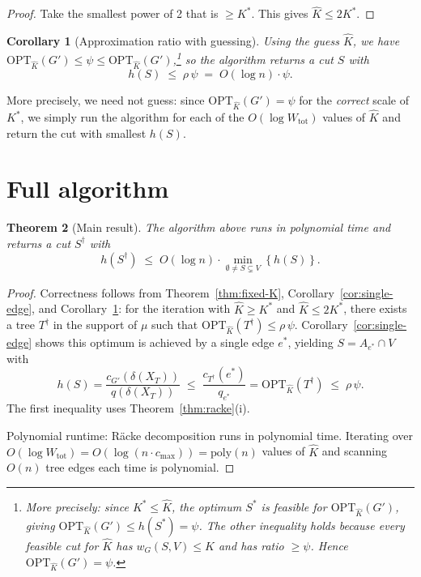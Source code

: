\documentclass[11pt]{article}
\newtheorem{theorem}{Theorem}
\newtheorem{corollary}[theorem]{Corollary}
\newcommand{\cut}{\delta}
\newcommand{\OPT}{\mathrm{OPT}}
\newcommand{\brc}[1]{\mathopen{}\left\{ #1 \right\}}
\begin{document}
\begin{proof}
  Take the smallest power of 2 that is $\ge K^*$.  This gives $\hat K\le 2K^*$.
\end{proof}

\begin{corollary}[Approximation ratio with guessing]\label{cor:approx}
  Using the guess $\hat K$, we have
  $\OPT_{\hat K}(G')\le \psi\le \OPT_{\hat K}(G')$,\footnote{More precisely:
  since $K^*\le\hat K$, the optimum $S^*$ is feasible for $\OPT_{\hat K}(G')$,
  giving $\OPT_{\hat K}(G')\le h(S^*)=\psi$. The other inequality holds because
  every feasible cut for $\hat K$ has $w_G(S,V)\le\hat K$ and has ratio $\ge\psi$.
  Hence $\OPT_{\hat K}(G')=\psi$.} so the algorithm returns a cut $S$ with
  \[
    h(S)\;\le\;\rho\,\psi
    \;=\;
    O(\log n)\cdot\psi.
  \]
\end{corollary}

More precisely, we need not guess: since $\OPT_{\hat K}(G')=\psi$ for the
\emph{correct} scale of $K^*$, we simply run the algorithm for each of the
$O(\log W_{\mathrm{tot}})$ values of $\hat K$ and return the cut with smallest $h(S)$.

\section{Full algorithm}



\begin{theorem}[Main result]\label{thm:main}
  The algorithm above runs in polynomial time and returns a cut $S^{\dagger}$ with
  \[
    h(S^{\dagger})\;\le\;O(\log n)\cdot\min_{\emptyset\neq S\subsetneq V}\brc{h(S)}.
  \]
\end{theorem}

\begin{proof}
  Correctness follows from Theorem~\ref{thm:fixed-K}, Corollary~\ref{cor:single-edge},
  and Corollary~\ref{cor:approx}:
  for the iteration with $\hat K\ge K^*$ and $\hat K\le 2K^*$, there exists a tree
  $T^{\dagger}$ in the support of $\mu$ such that $\OPT_{\hat K}(T^{\dagger})\le\rho\,\psi$.
  Corollary~\ref{cor:single-edge} shows this optimum is achieved by a single edge $e^*$,
  yielding $S = A_{e^*}\cap V$ with
  \[
    h(S)
    =\frac{c_{G'}(\cut(X_T))}{q(\cut(X_T))}
    \;\le\;
    \frac{c_{T^{\dagger}}(e^*)}{q_{e^*}}
    =\OPT_{\hat K}(T^{\dagger})
    \;\le\;
    \rho\,\psi.
  \]
  The first inequality uses Theorem~\ref{thm:racke}(i).

  Polynomial runtime: Räcke decomposition runs in polynomial time. Iterating over
  $O(\log W_{\mathrm{tot}})=O(\log(n\cdot c_{\max}))=\text{poly}(n)$ values of $\hat K$
  and scanning $O(n)$ tree edges each time is polynomial.
\end{proof}
\end{document}
